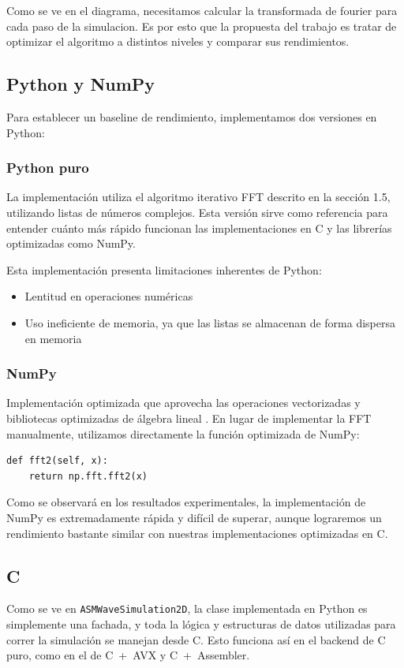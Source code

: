 \documentclass[a4paper]{article}
\begin{document}
Como se ve en el diagrama, necesitamos calcular la transformada de fourier para cada paso de la simulacion. Es por esto que la propuesta del trabajo es tratar de optimizar el algoritmo a distintos niveles y comparar sus rendimientos.

\subsection{Python y NumPy}

Para establecer un baseline de rendimiento, implementamos dos versiones en Python:

\subsubsection{Python puro} La implementación utiliza el algoritmo iterativo FFT descrito en la sección 1.5, utilizando listas de números complejos.
Esta versión sirve como referencia para entender cuánto más rápido funcionan las implementaciones en C y las librerías optimizadas como NumPy.

Esta implementación presenta limitaciones inherentes de Python:
\begin{itemize}
    \item Lentitud en operaciones numéricas
    \item Uso ineficiente de memoria, ya que las listas se almacenan de forma dispersa en memoria
\end{itemize}

\subsubsection{NumPy} Implementación optimizada que aprovecha las operaciones vectorizadas y bibliotecas optimizadas de álgebra lineal \cite{numpy2020array}. En lugar
de implementar la FFT manualmente, utilizamos directamente la función optimizada de NumPy:

\begin{verbatim}
def fft2(self, x):
    return np.fft.fft2(x)
\end{verbatim}

Como se observará en los resultados experimentales, la implementación de NumPy es extremadamente rápida y difícil de superar, aunque lograremos
un rendimiento bastante similar con nuestras implementaciones optimizadas en C.

\subsection{C}
Como se ve en \texttt{ASMWaveSimulation2D}, la clase implementada en Python es simplemente una fachada, y toda la lógica y estructuras de datos utilizadas para correr la simulación se manejan desde C. Esto funciona así en el backend de C puro, como en el de C~+~AVX y C~+~Assembler.
\end{document}
